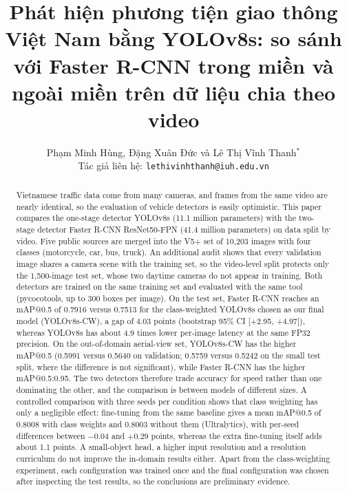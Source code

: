 \documentclass[10pt,journal,a4paper]{IEEEtran}
\begin{document}
\title{Phát hiện phương tiện giao thông Việt Nam bằng YOLOv8s: so sánh với Faster R-CNN trong miền và ngoài miền trên dữ liệu chia theo video}

\author{Phạm Minh Hùng, Đặng Xuân Đức và Lê Thị Vĩnh Thanh$^{*}$\\
Tác giả liên hệ: \texttt{lethivinhthanh@iuh.edu.vn}}

\maketitle

\begin{abstract}
Vietnamese traffic data come from many cameras, and frames from the same video are nearly identical, so the evaluation of vehicle detectors is easily optimistic. This paper compares the one-stage detector YOLOv8s (11.1 million parameters) with the two-stage detector Faster R-CNN ResNet50-FPN (41.4 million parameters) on data split by video. Five public sources are merged into the V5+ set of 10,203 images with four classes (motorcycle, car, bus, truck). An additional audit shows that every validation image shares a camera scene with the training set, so the video-level split protects only the 1,500-image test set, whose two daytime cameras do not appear in training. Both detectors are trained on the same training set and evaluated with the same tool (pycocotools, up to 300 boxes per image). On the test set, Faster R-CNN reaches an mAP@0.5 of 0.7916 versus 0.7513 for the class-weighted YOLOv8s chosen as our final model (YOLOv8s-CW), a gap of 4.03 points (bootstrap 95\% CI [+2.95, +4.97]), whereas YOLOv8s has about 4.9 times lower per-image latency at the same FP32 precision. On the out-of-domain aerial-view set, YOLOv8s-CW has the higher mAP@0.5 (0.5991 versus 0.5640 on validation; 0.5759 versus 0.5242 on the small test split, where the difference is not significant), while Faster R-CNN has the higher mAP@0.5:0.95. The two detectors therefore trade accuracy for speed rather than one dominating the other, and the comparison is between models of different sizes. A controlled comparison with three seeds per condition shows that class weighting has only a negligible effect: fine-tuning from the same baseline gives a mean mAP@0.5 of 0.8008 with class weights and 0.8003 without them (Ultralytics), with per-seed differences between $-0.04$ and $+0.29$ points, whereas the extra fine-tuning itself adds about 1.1 points. A small-object head, a higher input resolution and a resolution curriculum do not improve the in-domain results either. Apart from the class-weighting experiment, each configuration was trained once and the final configuration was chosen after inspecting the test results, so the conclusions are preliminary evidence.
\end{abstract}
\end{document}
